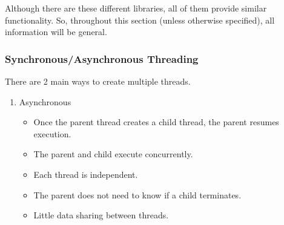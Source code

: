 Although there are these different libraries, all of them provide similar functionality.
So, throughout this section (unless otherwise specified), all information will be general.

\subsubsection{Synchronous/Asynchronous Threading}\label{subsubsec:Sync_Async_Threading}
There are 2 main ways to create multiple threads.
\begin{enumerate}[noitemsep]
\item Asynchronous
  \begin{itemize}[noitemsep]
  \item Once the parent thread creates a child thread, the parent resumes execution.
  \item The parent and child execute concurrently.
  \item Each thread is independent.
  \item The parent does not need to know if a child terminates.
  \item Little data sharing between threads.
  \end{itemize}
\end{enumerate}


